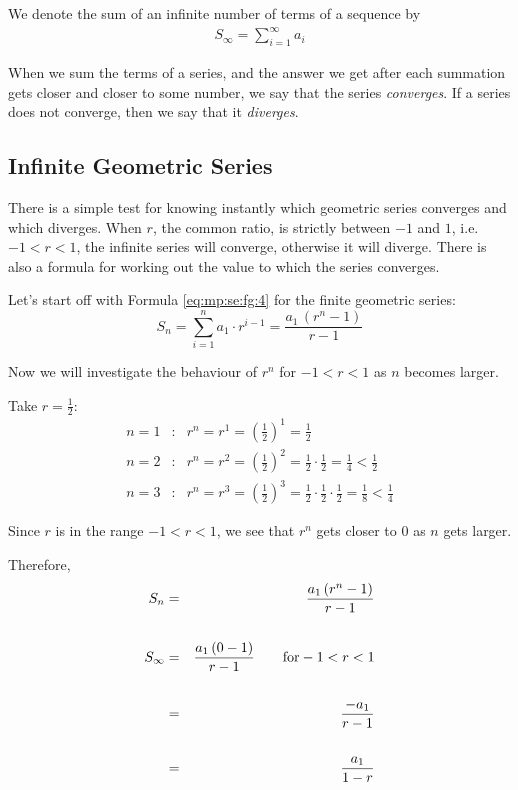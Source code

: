 We denote the sum of an infinite number of terms of a sequence by
\begin{eqnarray*}
S_\infty = \sum^\infty_{i=1} a_i
\end{eqnarray*}

When we sum the terms of a series, and the answer we get after each summation gets closer and closer to some number, we say that the series \textit{converges}. If a series does not converge, then we say that it \textit{diverges}.

\subsection{Infinite Geometric Series}

There is a simple test for knowing instantly which geometric series converges and which diverges. When $r$, the common ratio, is strictly between $-1$ and $1$, i.e. $-1 < r < 1$, the infinite series will converge, otherwise it will diverge. There is also a formula for working out the value to which the series converges.

Let's start off with Formula \eqref{eq:mp:se:fg:4} for the finite geometric series:
\begin{equation*}
S_n = \sum_{i=1}^n a_1 \cdot r^{i-1} = \frac{a_1 \, (r^n - 1)}{r-1}
\end{equation*}

Now we will investigate the behaviour of $r^n$ for $-1<r<1$ as $n$ becomes larger.

Take $r=\frac{1}{2}$:
\begin{eqnarray*}
n=1 &:& r^n = r^1 =(\tfrac{1}{2})^1 = \tfrac{1}{2} \\
n=2 &:& r^n = r^2 =(\tfrac{1}{2})^2 = \tfrac{1}{2} \cdot \tfrac{1}{2} = \tfrac{1}{4} < \tfrac{1}{2} \\
n=3 &:& r^n = r^3 =(\tfrac{1}{2})^3 = \tfrac{1}{2} \cdot \tfrac{1}{2} \cdot \tfrac{1}{2} = \tfrac{1}{8} < \tfrac{1}{4}
\end{eqnarray*}

Since $r$ is in the range $-1<r<1$, we see that $r^n$ gets closer to $0$ as $n$ gets larger.

Therefore,
\begin{eqnarray*}
S_n &=& \frac{a_1 \, (r^n - 1)}{r - 1} \\
\vspace{12pt} \\
S_\infty &=& \frac{a_1 \, (0 - 1)}{r - 1} \qquad \mathrm{ for } -1 < r < 1 \\
\vspace{12pt} \\
&=& \frac {-a_1}{r - 1} \\
\vspace{12pt} \\
&=& \frac {a_1}{1 - r}
\end{eqnarray*}


